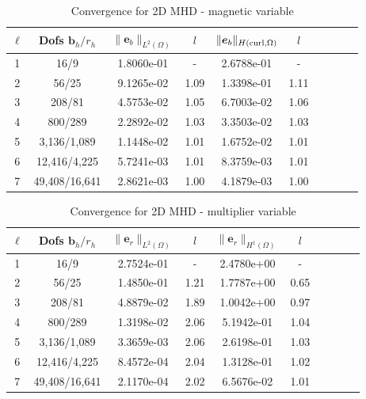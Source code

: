 \documentclass{article}
\newcommand{\uu}[1]{\boldsymbol #1}
\begin{document}
\begin{table}[h!]
\begin{center}
\begin{tabular}{cccccccccc}
\hline
\hline
$\ell$ &    Dofs $\uu{b}_h/r_h$ & $\|\uu{e}_b\|_{L^2(\Omega)}$ & $l$ & $\|\uu{e}_b\|_{H({\rm curl},\Omega)}$ & $l$ \\
\hline\hline
 1 &     16/9 &  1.8060e-01 &     - &  2.6788e-01 &        - \\
 2 &     56/25 &  9.1265e-02 &     1.09 &  1.3398e-01 &        1.11 \\
 3 &    208/81 &  4.5753e-02 &     1.05 &  6.7003e-02 &        1.06 \\
 4 &    800/289 &  2.2892e-02 &     1.03 &  3.3503e-02 &        1.03 \\
 5 &   3,136/1,089 &  1.1448e-02 &     1.01 &  1.6752e-02 &        1.01 \\
 6 &  12,416/4,225 &  5.7241e-03 &     1.01 &  8.3759e-03 &        1.01 \\
 7 &  49,408/16,641 &  2.8621e-03 &     1.00 &  4.1879e-03 &        1.00 \\
\hline\hline

\end{tabular}
\caption{Convergence for 2D MHD  - magnetic variable}
\label{tab:MHD_2D_smooth_magnetic}
\end{center}
\end{table}



\begin{table}[h!]
\begin{center}
\begin{tabular}{cccccccccc}
\hline
\hline
$\ell$ &    Dofs $\uu{b}_h/r_h$ & $\|\uu{e}_r\|_{L^2(\Omega)}$ & $l$ & $\|\uu{e}_r\|_{H^1(\Omega)}$ & $l$ \\
\hline\hline
  1 &     16/9 &  2.7524e-01 &     - &  2.4780e+00 &     - \\
  2 &     56/25 &  1.4850e-01 &     1.21 &  1.7787e+00 &     0.65 \\
  3 &    208/81 &  4.8879e-02 &     1.89 &  1.0042e+00 &     0.97 \\
  4 &    800/289 &  1.3198e-02 &     2.06 &  5.1942e-01 &     1.04 \\
  5 &   3,136/1,089 &  3.3659e-03 &     2.06 &  2.6198e-01 &     1.03 \\
  6 &  12,416/4,225 &  8.4572e-04 &     2.04 &  1.3128e-01 &     1.02 \\
  7 &  49,408/16,641 &  2.1170e-04 &     2.02 &  6.5676e-02 &     1.01 \\
\hline\hline

\end{tabular}
\caption{Convergence for 2D MHD  - multiplier variable}
\label{tab:MHD_2D_smooth_multiplier}
\end{center}
\end{table}
\end{document}
